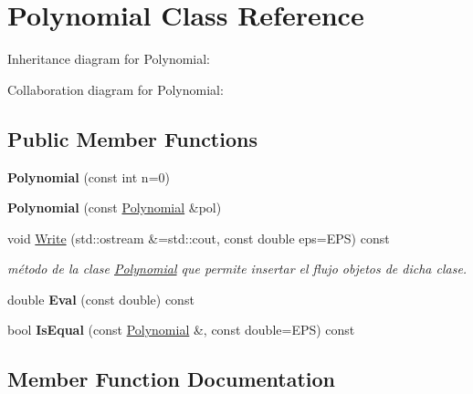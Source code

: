 \hypertarget{classPolynomial}{}\section{Polynomial Class Reference}
\label{classPolynomial}


Inheritance diagram for Polynomial\+:


Collaboration diagram for Polynomial\+:
\subsection*{Public Member Functions}
\begin{DoxyCompactItemize}
\item 
\mbox{\label{classPolynomial_a33c5876921a80767b9e369fb3f8c05e3}} 
{\bfseries Polynomial} (const int n=0)
\item 
\mbox{\label{classPolynomial_a8c4f5ce6207092235003f9178657732e}} 
{\bfseries Polynomial} (const \hyperlink{classPolynomial}{Polynomial} \&pol)
\item 
void \hyperlink{classPolynomial_a5126b95be2d40423a685bcd69789995f}{Write} (std\+::ostream \&=std\+::cout, const double eps=E\+PS) const
\begin{DoxyCompactList}\small\item\em método de la clase \hyperlink{classPolynomial}{Polynomial} que permite insertar el flujo objetos de dicha clase. \end{DoxyCompactList}\item 
\mbox{\label{classPolynomial_accedb528e3a84c91f9f2b47dc7f9e459}} 
double {\bfseries Eval} (const double) const
\item 
\mbox{\label{classPolynomial_aaa9e9da13f38104bb566033a025a58fd}} 
bool {\bfseries Is\+Equal} (const \hyperlink{classPolynomial}{Polynomial} \&, const double=E\+PS) const
\end{DoxyCompactItemize}


\subsection{Member Function Documentation}
\mbox{\label{classPolynomial_a5126b95be2d40423a685bcd69789995f}} 
